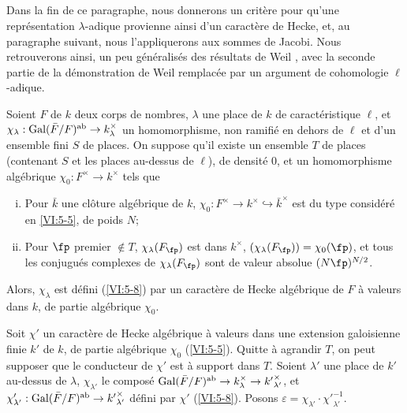 \subsection{}\label{VI:5-9}

Dans la fin de ce paragraphe, nous donnerons un critère pour qu'une 
représentation $\lambda$-adique provienne ainsi d'un caractère de Hecke, 
et, au paragraphe suivant, nous l'appliquerons aux sommes de Jacobi. Nous 
retrouverons ainsi, un peu généralisés des résultats de Weil 
\cite{we52,we74-2}, avec la seconde partie de la démonstration de Weil 
remplacée par un argument de cohomologie $\ell$-adique. 





\begin{theorem_}\label{VI:5-10}
Soient $F$ de $k$ deux corps de nombres, $\lambda$ une place de $k$ de 
caractéristique $\ell$, et 
$\chi_\lambda:\operatorname{Gal}(\bar F/F)^\textnormal{ab}\to k_\lambda^\times$ un 
homomorphisme, non ramifié en dehors de $\ell$ et d'un ensemble fini $S$ de 
places. On suppose qu'il existe un ensemble $T$ de places (contenant $S$ et les 
places au-dessus de $\ell$), de densité $0$, et un homomorphisme algébrique 
$\chi_0:F^\times \to k^\times$ tels que 
\begin{enumerate}[(i)]
  \item Pour $\bar k$ une clôture algébrique de $k$, 
    $\chi_0:F^\times \to k^\times \hookrightarrow \bar k^\times$ est du type 
    considéré en \ref{VI:5-5}, de poids $N$; 
  \item Pour $\fp$ premier $\notin T$, $\chi_\lambda(F_\fp)$ est dans 
    $k^\times$, $(\chi_\lambda(F_\fp))=\chi_0(\fp)$, et tous les conjugués 
    complexes de $\chi_\lambda(F_\fp)$ sont de valeur absolue $(N \fp)^{N/2}$. 
\end{enumerate}

Alors, $\chi_\lambda$ est défini (\ref{VI:5-8}) par un caractère de Hecke 
algébrique de $F$ à valeurs dans $k$, de partie algébrique $\chi_0$. 
\end{theorem_}

Soit $\chi'$ un caractère de Hecke algébrique à valeurs dans une 
extension galoisienne finie $k'$ de $k$, de partie algébrique $\chi_0$ 
(\ref{VI:5-5}). Quitte à agrandir $T$, on peut supposer que le conducteur de 
$\chi'$ est à support dans $T$. Soient $\lambda'$ une place de $k'$ au-dessus 
de $\lambda$, $\chi_{\lambda'}$ le composé 
$\operatorname{Gal}(\bar F/F)^\text{ab}\to k_\lambda^\times \to {k'}_{\lambda'}^\times$, et 
$\chi_{\lambda'}':\operatorname{Gal}(\bar F/F)^\text{ab}\to {k'}_{\lambda'}^\times$ défini 
par $\chi'$ (\ref{VI:5-8}). Posons 
$\varepsilon = \chi_{\lambda'} \cdot {\chi'}_{\lambda'}^{-1}$. 

